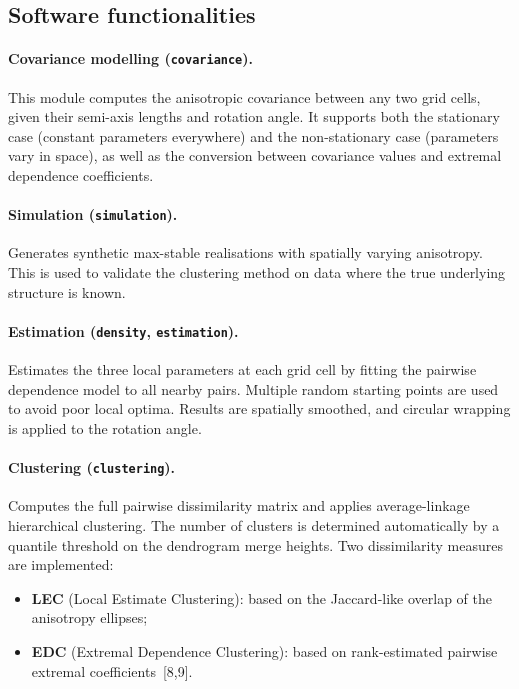 \documentclass[preprint,12pt,a4paper]{elsarticle}
\begin{document}
\subsection{Software functionalities}
\label{sec:functionalities}

\paragraph{Covariance modelling (\texttt{covariance}).}
This module computes the anisotropic covariance between any two
grid cells, given their semi-axis lengths and rotation angle.
It supports both the stationary case (constant parameters
everywhere) and the non-stationary case (parameters vary in
space), as well as the conversion between covariance values and
extremal dependence coefficients.

\paragraph{Simulation (\texttt{simulation}).}
Generates synthetic max-stable realisations with spatially
varying anisotropy.  This is used to validate the clustering
method on data where the true underlying structure is known.

\paragraph{Estimation (\texttt{density}, \texttt{estimation}).}
Estimates the three local parameters at each grid cell by fitting
the pairwise dependence model to all nearby pairs.  Multiple
random starting points are used to avoid poor local optima.
Results are spatially smoothed, and circular wrapping is
applied to the rotation angle.

\paragraph{Clustering (\texttt{clustering}).}
Computes the full pairwise dissimilarity matrix and applies
average-linkage hierarchical clustering.  The number of clusters
is determined automatically by a quantile threshold on the
dendrogram merge heights.  Two dissimilarity measures are
implemented:
\begin{itemize}
\item \textbf{LEC} (Local Estimate Clustering): based on the
  Jaccard-like overlap of the anisotropy ellipses;
\item \textbf{EDC} (Extremal Dependence Clustering): based on
  rank-estimated pairwise extremal coefficients~[8,9].
\end{itemize}
\end{document}
